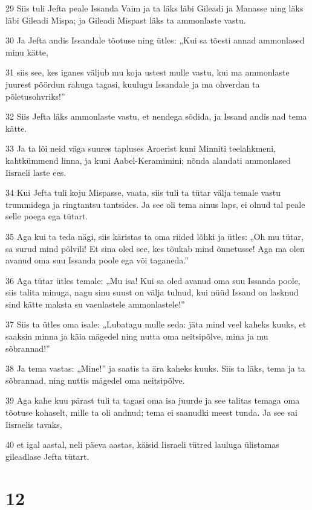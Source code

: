 \par 29 Siis tuli Jefta peale Issanda Vaim ja ta läks läbi Gileadi ja Manasse ning läks läbi Gileadi Mispa; ja Gileadi Mispast läks ta ammonlaste vastu.
\par 30 Ja Jefta andis Issandale tõotuse ning ütles: „Kui sa tõesti annad ammonlased minu kätte,
\par 31 siis see, kes iganes väljub mu koja ustest mulle vastu, kui ma ammonlaste juurest pöördun rahuga tagasi, kuulugu Issandale ja ma ohverdan ta põletusohvriks!”
\par 32 Siis Jefta läks ammonlaste vastu, et nendega sõdida, ja Issand andis nad tema kätte.
\par 33 Ja ta lõi neid väga suures tapluses Aroerist kuni Minniti teelahkmeni, kahtkümmend linna, ja kuni Aabel-Keramimini; nõnda alandati ammonlased Iisraeli laste ees.
\par 34 Kui Jefta tuli koju Mispasse, vaata, siis tuli ta tütar välja temale vastu trummidega ja ringtantsu tantsides. Ja see oli tema ainus laps, ei olnud tal peale selle poega ega tütart.
\par 35 Aga kui ta teda nägi, siis käristas ta oma riided lõhki ja ütles: „Oh mu tütar, sa surud mind põlvili! Et sina oled see, kes tõukab mind õnnetusse! Aga ma olen avanud oma suu Issanda poole ega või taganeda.”
\par 36 Aga tütar ütles temale: „Mu isa! Kui sa oled avanud oma suu Issanda poole, siis talita minuga, nagu sinu suust on välja tulnud, kui nüüd Issand on lasknud sind kätte maksta su vaenlastele ammonlastele!”
\par 37 Siis ta ütles oma isale: „Lubatagu mulle seda: jäta mind veel kaheks kuuks, et saaksin minna ja käia mägedel ning nutta oma neitsipõlve, mina ja mu sõbrannad!”
\par 38 Ja tema vastas: „Mine!” ja saatis ta ära kaheks kuuks. Siis ta läks, tema ja ta sõbrannad, ning nuttis mägedel oma neitsipõlve.
\par 39 Aga kahe kuu pärast tuli ta tagasi oma isa juurde ja see talitas temaga oma tõotuse kohaselt, mille ta oli andnud; tema ei saanudki meest tunda. Ja see sai Iisraelis tavaks,
\par 40 et igal aastal, neli päeva aastas, käisid Iisraeli tütred lauluga ülistamas gileadlase Jefta tütart.

\chapter{12}

